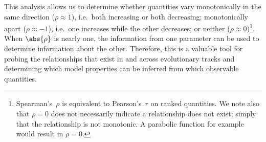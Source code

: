 This analysis allows us to determine whether quantities vary monotonically in the same direction (${\rho \approx 1}$), i.e.~both increasing or both decreasing; monotonically apart (${\rho \approx -1}$), i.e.~one increases while the other decreases; or neither (${\rho \approx 0}$)\footnote{Spearman's~$\rho$ is equivalent to Pearson's~$r$ on ranked quantities. We note also that ${\rho = 0}$ does not necessarily indicate a  relationship does not exist; simply that the relationship is not monotonic. A parabolic function for example would result in ${\rho = 0}$.}. When $\abs{\rho}$ is nearly one, the information from one parameter can be used to determine information about the other. Therefore, this is a valuable tool for probing the relationships that exist in and across evolutionary tracks and determining which model properties can be inferred from which observable quantities. 

